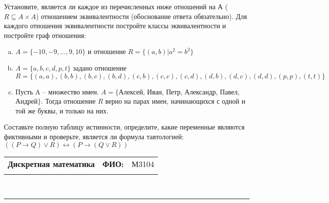 \documentclass[10pt]{exam}
\newcommand{\class}{Дискретная математика}
\newcommand{\examdate}{}
\begin{document}
\begin{questions}
\question
Установите, является ли каждое из перечисленных ниже отношений на А ($R \subseteq A \times A$) отношением эквивалентности (обоснование ответа обязательно). Для каждого отношения эквивалентности постройте классы 
эквивалентности и постройте граф отношения:
\begin{enumerate} [a)]\setcounter{enumi}{0}
\item $A = \{-10, -9, … , 9, 10\}$ и отношение $R = \{(a,b)|a^{2} = b^{2}\}$
\item $A = \{a, b, c, d, p, t\}$ задано отношение $R = \{(a, a), (b, b), (b, c), (b, d), (c, b), (c, c), (c, d), (d, b), (d, c), (d, d), (p,p), (t,t)\}$
\item Пусть A – множество имен. $A = \{ $Алексей, Иван, Петр, Александр, Павел, Андрей$ \}$. Тогда отношение $R$ верно на парах имен, начинающихся с одной и той же буквы, и только на них.
\end{enumerate}\question Составьте полную таблицу истинности, определите, какие переменные являются фиктивными и проверьте, является ли формула тавтологией:
$((P \rightarrow Q) \lor R) \leftrightarrow (P \rightarrow (Q \lor R))$

\end{questions}
\newpage
\begin{flushright}
\begin{tabular}{p{2.8in} r l}
\textbf{\class} & \textbf{ФИО:} &М3104
\\

\textbf{\examdate} &&\\
\end{tabular}\\
\end{flushright}
\rule[1ex]{\textwidth}{.1pt}
\end{document}
